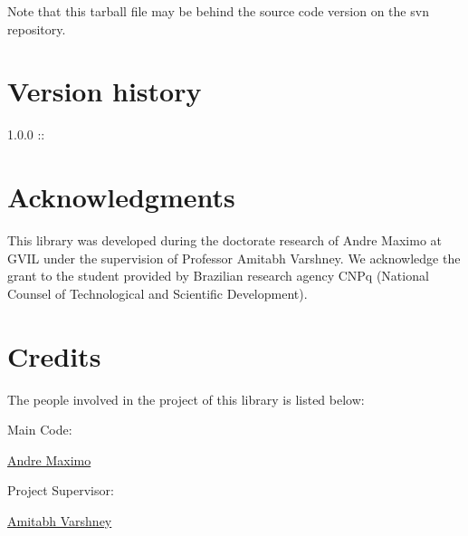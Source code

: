 Note that this tarball file may be behind the source code version on the svn repository.\hypertarget{main_history}{}\section{Version history}\label{main_history}
\begin{DoxyItemize}
\item 1.0.0 ::\end{DoxyItemize}
\hypertarget{main_acknowledgments}{}\section{Acknowledgments}\label{main_acknowledgments}
This library was developed during the doctorate research of Andre Maximo at GVIL under the supervision of Professor Amitabh Varshney. We acknowledge the grant to the student provided by Brazilian research agency CNPq (National Counsel of Technological and Scientific Development).\hypertarget{main_credits}{}\section{Credits}\label{main_credits}
The people involved in the project of this library is listed below:

Main Code: \begin{DoxyParagraph}{}
  \href{http://www.impa.br/~andmax}{Andre Maximo} 
\end{DoxyParagraph}
Project Supervisor: \begin{DoxyParagraph}{}
  \href{http://www.cs.umd.edu/~varshney}{Amitabh Varshney}  
\end{DoxyParagraph}
